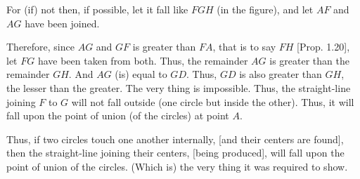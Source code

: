 \begin{Parallel}{}{}
{For (if) not then, if possible, let it fall like $FGH$ (in the figure), and
let $AF$ and $AG$ have been joined.

Therefore, since $AG$ and $GF$ is greater than $FA$, that is to
say $FH$ [Prop. 1.20], let $FG$ have been taken from both.
Thus, the remainder $AG$ is greater than the remainder $GH$.
And $AG$ (is) equal to $GD$. Thus, $GD$ is also greater than $GH$, the lesser
than the greater. The very thing is impossible. Thus, the straight-line
joining $F$ to $G$ will not fall outside (one circle but inside the other). Thus, it will fall upon the point of
union (of the circles) at point $A$. 

\epsfysize=2.2in
\centerline{}

Thus, if two circles  touch one another internally, [and their
centers are found], then  the straight-line joining their
centers, [being produced], will fall upon the point of union of
the circles. (Which is) the very thing it was required to show.}
\end{Parallel}


